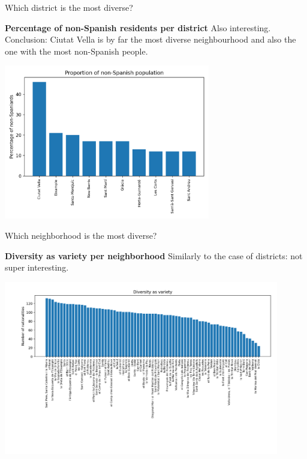 \documentclass[8pt]{beamer}
\begin{document}
\begin{frame}{Which district is the most diverse?}

\begin{block}{\textbf{Percentage of non-Spanish residents per district}} 
Also interesting. Conclusion: Ciutat Vella is by far the most diverse neighbourhood and also the one with the most non-Spanish people.
\end{block}

\includegraphics[width=9cm]{proportion_non_spanish_districts.png}

\end{frame}


\begin{frame}{Which neighborhood is the most diverse?}

\begin{block}{\textbf{Diversity as variety per neighborhood}}
Similarly to the case of districts: not super interesting.
\end{block}

\includegraphics[width=12cm, trim= 3cm 4cm 0cm 0cm]{diversity_as_variety_barris.png}


\end{frame}
\end{document}
